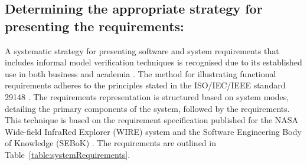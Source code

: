 \documentclass{ieeeaccess}
\begin{document}
\subsection{Determining the appropriate strategy for presenting the requirements:} 

A systematic strategy for presenting software and system requirements that includes informal model verification techniques is recognised due to its established use in both business and academia \cite{kassab2014state}. The method for illustrating functional requirements adheres to the principles stated in the ISO/IEC/IEEE standard 29148 \cite{ISO29148}. The requirements representation is structured based on system modes, detailing the primary components of the system, followed by the requirements. This technique is based on the requirement specification published for the NASA Wide-field InfraRed Explorer (WIRE) system \cite{NASA} and the Software Engineering Body of Knowledge (SEBoK) \cite{abran2004software}. The requirements are outlined in Table~\ref{table:systemRequirements}.
\end{document}

